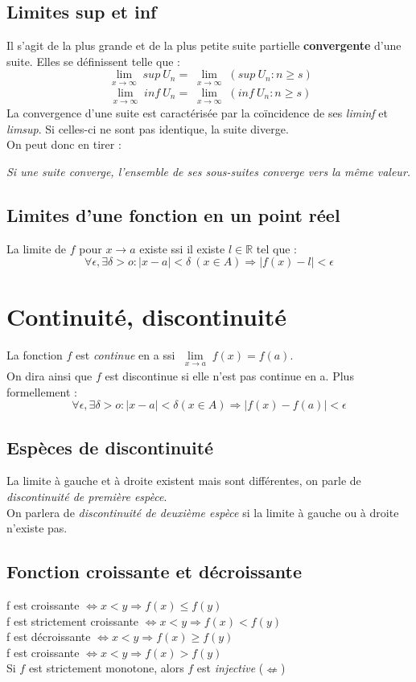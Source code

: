 \documentclass[british,french,11pt, a4paper, openany]{book}
\begin{document}
\subsection{Limites sup et inf}
Il s'agit de la plus grande et de la plus petite suite partielle \textbf{convergente} d'une suite. Elles se définissent telle que :
$$ \lim\limits_{\substack{x \to \infty}} sup\ U_{n} = \lim\limits_{\substack{x \to \infty}} (sup\ {U_{n} : n \geq s})$$
$$ \lim\limits_{\substack{x \to \infty}} inf\ U_{n} = \lim\limits_{\substack{x \to \infty}} (inf\ {U_{n} : n \geq s})$$
La convergence d'une suite est caractérisée par la coïncidence de ses \textit{liminf} et \textit{limsup}. Si celles-ci ne sont pas identique, la suite diverge.\\
On peut donc en tirer :\\
\begin{center}
	\textit{Si une suite converge, l'ensemble de ses sous-suites converge vers la même valeur.}
\end{center}

\subsection{Limites d'une fonction en un point réel}
La limite de $f$ pour $x \rightarrow a$ existe ssi il existe $l \in \mathbb{R}$ tel que : 
$$\forall \epsilon, \exists \delta > o : |x-a| < \delta\ (x \in A) \Rightarrow |f(x) - l| < \epsilon$$

\section{Continuité, discontinuité}
La fonction $f$ est \textit{continue} en a ssi $\lim\limits_{\substack{x \to a}} f(x) = f(a)$. \\
On dira ainsi que $f$ est discontinue si elle n'est pas continue en a. Plus formellement : 
$$\forall \epsilon, \exists \delta > o : |x-a| < \delta (x \in A) \Rightarrow |f(x) - f(a)| < \epsilon$$

\subsection{Espèces de discontinuité}
La limite à gauche et à droite existent mais sont différentes, on parle de \textit{discontinuité de première espèce}.\\
On parlera de \textit{discontinuité de deuxième espèce} si la limite à gauche ou à droite n'existe pas.

\subsection{Fonction croissante et décroissante}
f est croissante $\Leftrightarrow x < y \Rightarrow f(x) \leq f(y)$\\
f est strictement croissante $\Leftrightarrow x < y \Rightarrow f(x) < f(y)$\\
f est décroissante $\Leftrightarrow x < y \Rightarrow f(x) \geq f(y)$\\
f est croissante $\Leftrightarrow x < y \Rightarrow f(x) > f(y)$\\
Si $f$ est strictement monotone, alors $f$ est \textit{injective} ($\nLeftarrow$)
\end{document}
